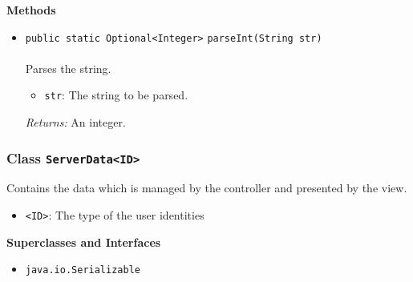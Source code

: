\textbf{\sffamily Methods}
\begin{itemize}
\item \lstinline|public static Optional<Integer>| \lstinline|parseInt|\lstinline|(String str)|\\ \\[-0.6em]
Parses the string.
\begin{itemize}
\item \lstinline|str|: The string to be parsed.
\end{itemize}

\emph{Returns:} An integer.

\end{itemize}

\subsubsection{Class \lstinline|ServerData<ID>|}
Contains the data which is managed by the controller and presented by the view. \\
\noindent\begin{minipage}[t]{5cm}
\vspace{0.3em}
\hspace*{2em}
\vspace{0.3em}
\end{minipage}

\begin{itemize}
\item \lstinline|<ID>|: The type of the user identities
\end{itemize}


\textbf{\sffamily Superclasses and Interfaces}
\begin{itemize}
\item \lstinline|java.io.Serializable|
\end{itemize}


